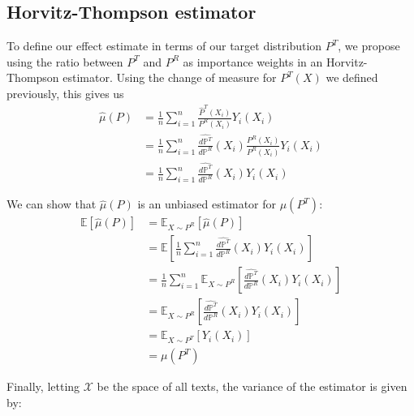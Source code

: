 \documentclass{article}
\begin{document}
\subsection{Horvitz-Thompson estimator}

To define our effect estimate in terms of our target distribution $P^T$, we propose using the ratio between $P^T$ and $P^R$ as importance weights in an Horvitz-Thompson estimator. Using the change of measure for $P^T(X)$ we defined previously, this gives us
\begin{equation*}
    \begin{split}
        \hat{\mu}(P) &= \frac{1}{n} \sum_{i=1}^n \frac{\hat{P}^T(X_i)}{P^R(X_i)}Y_i(X_i) \\
        &= \frac{1}{n} \sum_{i=1}^n \frac{\hat{d \mathbb{P}^T}}{d \mathbb{P}^R}(X_i)\frac{P^R(X_i)}{P^R(X_i)} Y_i(X_i) \\
        &= \frac{1}{n} \sum_{i=1}^n \frac{\hat{d \mathbb{P}^T}}{d \mathbb{P}^R}(X_i)Y_i(X_i)
    \end{split}
\end{equation*}

We can show that $\hat{\mu}(P)$ is an unbiased estimator for $\mu(P^T)$:
\begin{equation*}
    \begin{split}
        \mathbb{E}[\hat{\mu}(P)] &= \mathbb{E}_{X \sim P^R}[\hat{\mu}(P)] \\
        &= \mathbb{E}\left[\frac{1}{n} \sum_{i=1}^n \frac{\hat{d \mathbb{P}^T}}{d \mathbb{P}^R}(X_i)Y_i(X_i)\right] \\
        &=\frac{1}{n}\sum_{i=1}^n \mathbb{E}_{X \sim P^R}\left[\frac{\hat{d \mathbb{P}^T}}{d \mathbb{P}^R}(X_i)Y_i(X_i)\right] \\
        &= \mathbb{E}_{X \sim P^R}\left[\frac{\hat{d \mathbb{P}^T}}{d \mathbb{P}^R}(X_i)Y_i(X_i)\right] \\
        &=\mathbb{E}_{X \sim P^T}[Y_i(X_i)] \\
        &= \mu(P^T)
    \end{split}
\end{equation*}

Finally, letting $\mathcal{X}$ be the space of all texts, the variance of the estimator is given by:
\end{document}
